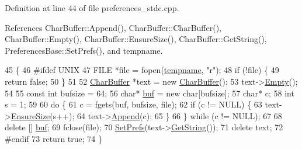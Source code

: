Definition at line 44 of file preferences\+\_\+stdc.\+cpp.



References Char\+Buffer\+::\+Append(), Char\+Buffer\+::\+Char\+Buffer(), Char\+Buffer\+::\+Empty(), Char\+Buffer\+::\+Ensure\+Size(), Char\+Buffer\+::\+Get\+String(), Preferences\+Base\+::\+Set\+Prefs(), and tempname.


\begin{DoxyCode}
45 \{
46 \textcolor{preprocessor}{#ifdef UNIX}
47     FILE *file = fopen(\hyperlink{preferences__stdc_8cpp_a7912698eed685a41c84e260ebb21d818}{tempname}, \textcolor{stringliteral}{"r"});
48     \textcolor{keywordflow}{if} (!file) \{
49         \textcolor{keywordflow}{return} \textcolor{keyword}{false};
50     \}
51 
52     \hyperlink{classCharBuffer}{CharBuffer} *text = \textcolor{keyword}{new} \hyperlink{classCharBuffer}{CharBuffer}();
53     text->\hyperlink{classCharBuffer_abe39d3fd7d8b9c8ec343af2cae7adc96}{Empty}();
54 
55     \textcolor{keyword}{const} \textcolor{keywordtype}{int} bufsize = 64;
56     \textcolor{keywordtype}{char}* \hyperlink{classPreferencesBase_a56ccdce81b9347c99eacb1839cee0a49}{buf} = \textcolor{keyword}{new} \textcolor{keywordtype}{char}[bufsize];
57     \textcolor{keywordtype}{char}* c;
58     \textcolor{keywordtype}{int} s = 1;
59 
60     \textcolor{keywordflow}{do} \{
61         c = fgets(buf, bufsize, file);
62         \textcolor{keywordflow}{if} (c != NULL) \{
63             text->\hyperlink{classCharBuffer_ad1907009b5ad136692b989fa96bf2f7e}{EnsureSize}(s++);
64             text->\hyperlink{classCharBuffer_a045b38735f7b3007c1b98d3d7b7feafe}{Append}(c);
65         \}
66     \} \textcolor{keywordflow}{while} (c != NULL);
67 
68     \textcolor{keyword}{delete} [] \hyperlink{classPreferencesBase_a56ccdce81b9347c99eacb1839cee0a49}{buf};
69     fclose(file);
70     \hyperlink{classPreferencesBase_a90dcd05552f94429b05df661eb72b5e2}{SetPrefs}(text->\hyperlink{classCharBuffer_a7dfd3feaaf80f318ba44efe15b1ec44b}{GetString}());
71     \textcolor{keyword}{delete} text;
72 \textcolor{preprocessor}{#endif}
73     \textcolor{keywordflow}{return} \textcolor{keyword}{true};
74 \}
\end{DoxyCode}


